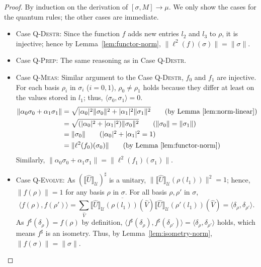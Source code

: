 \NormpresTheorem*
\begin{proof}
  By induction on the derivation of $[\sigma,M] \longrightarrow \mu$.
  We only show the cases for the quantum rules; the other cases are immediate.
  \begin{itemize}
    \item Case \textsc{Q-Destr}: Since the function $f$ adds new entries $l_2$ and $l_3$ to $\rho$, it is injective; hence by Lemma~\ref{lem:functor-norm}, $\|\ell^2(f)(\sigma)\| = \|\sigma\|$.
    \item Case \textsc{Q-Prep}: The same reasoning as in Case \textsc{Q-Destr}.
    \item Case \textsc{Q-Meas}: Similar argument to the Case \textsc{Q-Destr}, $f_0$ and $f_1$ are injective.
          For each basis $\rho_i$ in $\sigma_i$ ($i=0,1$), $\rho_0 \ne \rho_1$ holds because they differ at least on the values stored in $l_1$; thus, $\langle \sigma_0, \sigma_1\rangle = 0$.
          \begin{align*}
            \|\alpha_0\sigma_0 +\alpha_1\sigma_1\|
             & = \sqrt{|\alpha_0|^2 \|\sigma_0\|^2+|\alpha_1|^2 \|\sigma_1\|^2} \tag{by Lemma~\ref{lem:norm-linear}} \\
             & = \sqrt{(|\alpha_0|^2 + |\alpha_1|^2) \|\sigma_0\|^2} \tag{$\|\sigma_0\| = \|\sigma_1\|$}             \\
             & = \|\sigma_0\| \tag{$|\alpha_0|^2 + |\alpha_1|^2 = 1$}                                                \\
             & = \|\ell^2(f_0)(\sigma_0)\| \tag{by Lemma \ref{lem:functor-norm}}
          \end{align*}
          Similarly, $\|\alpha_0\sigma_0 +\alpha_1\sigma_1\| = \|\ell^2(f_1)(\sigma_1)\|$.
    \item Case \textsc{Q-Evolve}: As $(\llbracket\hat{U}\rrbracket_\mathcal{U})^\sharp$ is a unitary, $\|\llbracket\hat{U}\rrbracket_\mathcal{U}(\rho(l_1))\|^2 = 1$; hence, $\|f(\rho)\| = 1$ for any basis $\rho$ in $\sigma$.
          For all basis $\rho, \rho'$ in $\sigma$,
          \begin{equation*}
            \langle f(\rho), f(\rho')\rangle = \sum_{\hat{V}}\overline{\llbracket\hat{U}\rrbracket_\mathcal{U}(\rho(l_1))(\hat{V})}\llbracket\hat{U}\rrbracket_\mathcal{U}(\rho'(l_1))(\hat{V}) = \langle \delta_\rho, \delta_{\rho'}\rangle.
          \end{equation*}
          As $f^\sharp(\delta_\rho) = f(\rho)$ by definition, $\langle f^\sharp(\delta_\rho), f^\sharp(\delta_{\rho'})\rangle = \langle \delta_\rho, \delta_{\rho'}\rangle$ holds, which means $f^\sharp$ is an isometry.
          Thus, by Lemma~\ref{lem:isometry-norm}, $\|f(\sigma)\| = \|\sigma\|$.
  \end{itemize}
\end{proof}